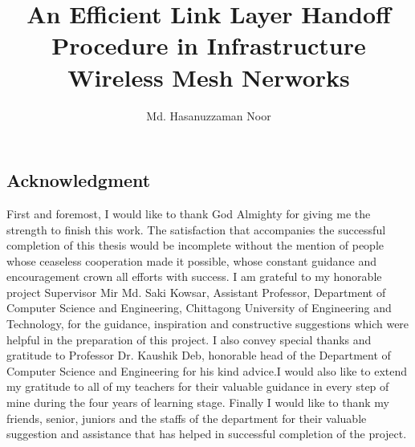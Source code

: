 \documentclass[12pt,a4paper]{report}
\author{Md. Hasanuzzaman Noor}
\title{An Efficient Link Layer Handoff Procedure in Infrastructure Wireless Mesh Nerworks}
\begin{document}
\maketitle

\newpage
\begin{center}
\section*{Acknowledgment}
\justify
First and foremost, I would like to thank God Almighty for giving me the strength to finish this work. The satisfaction that accompanies the successful completion of this thesis would be incomplete without the mention of people whose ceaseless cooperation made it possible, whose constant guidance and encouragement crown all efforts with success. I am grateful to my honorable project Supervisor Mir Md. Saki Kowsar, Assistant Professor, Department of Computer Science and Engineering, Chittagong University of Engineering and Technology, for the guidance, inspiration and constructive suggestions which were helpful in the preparation of this project. I also convey special thanks and gratitude to Professor Dr. Kaushik Deb, honorable head of the Department of Computer Science and Engineering for his kind advice.I would also like to extend my gratitude to all of my teachers for their valuable guidance in every step of mine during the four years of learning stage. Finally I would like to thank my friends, senior, juniors and the staffs of the department for their valuable suggestion and assistance that has helped in successful completion of the project. 
\end{center}
\newpage
\end{document}
